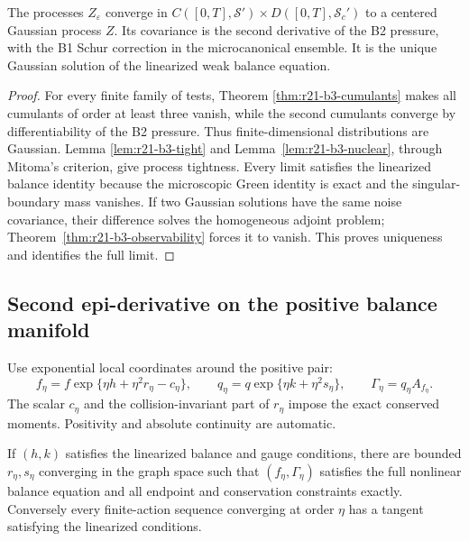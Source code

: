 \begin{theorem}
\label{thm:r21-b3-clt}
The processes $Z_\varepsilon$ converge in
$C([0,T],\mathscr S')\times D([0,T],\mathscr S_c')$ to a centered Gaussian
process $Z$.  Its covariance is the second derivative of the B2 pressure,
with the B1 Schur correction in the microcanonical ensemble.  It is the unique
Gaussian solution of the linearized weak balance equation.
\end{theorem}

\begin{proof}
For every finite family of tests, Theorem
\ref{thm:r21-b3-cumulants} makes all cumulants of order at least three vanish,
while the second cumulants converge by differentiability of the B2 pressure.
Thus finite-dimensional distributions are Gaussian.  Lemma
\ref{lem:r21-b3-tight} and Lemma~\ref{lem:r21-b3-nuclear}, through Mitoma's
criterion, give process tightness.  Every limit satisfies the linearized
balance identity because the microscopic Green identity is exact and the
singular-boundary mass vanishes.  If two Gaussian solutions have the same
noise covariance, their difference solves the homogeneous adjoint problem;
Theorem~\ref{thm:r21-b3-observability} forces it to vanish.  This proves
uniqueness and identifies the full limit.
\end{proof}

\subsection{Second epi-derivative on the positive balance manifold}

Use exponential local coordinates around the positive pair:
\[
 f_\eta=f\exp\{\eta h+\eta^2r_\eta-c_\eta\},
 \qquad
 q_\eta=q\exp\{\eta k+\eta^2s_\eta\},
 \qquad
 \Gamma_\eta=q_\eta A_{f_\eta}.
\]
The scalar $c_\eta$ and the collision-invariant part of $r_\eta$ impose the
exact conserved moments.  Positivity and absolute continuity are automatic.

\begin{lemma}
\label{lem:r21-b3-chart}
If $(h,k)$ satisfies the linearized balance and gauge conditions, there are
bounded $r_\eta,s_\eta$ converging in the graph space such that
$(f_\eta,\Gamma_\eta)$ satisfies the full nonlinear balance equation and all
endpoint and conservation constraints exactly.  Conversely every
finite-action sequence converging at order $\eta$ has a tangent satisfying the
linearized conditions.
\end{lemma}

